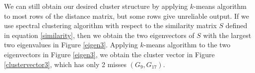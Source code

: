 \documentclass{amsart}
\begin{document}
%
	We can still obtain our desired cluster structure by applying $k$-means algorithm to most rows of  the distance matrix, but some rows give unreliable output. If we use spectral clustering algorithm with respect to the similarity matrix $S$ defined in equation \eqref{similarity}, then we obtain the two eigenvectors of $S$ with the largest two eigenvalues in Figure \ref{eigen3}. Applying $k$-means algorithm to the two eigenvectors in Figure \ref{eigen3}, we obtain the cluster vector in Figure \ref{clustervector3}, which has only 2 misses $(G_9,G_{17})$. 
%





\end{document}
